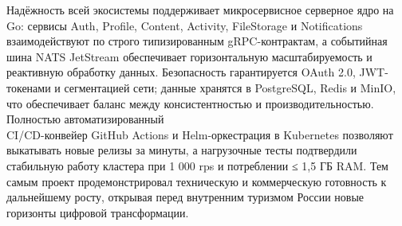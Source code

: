 Надёжность всей экосистемы поддерживает микросервисное серверное ядро на Go: сервисы Auth, Profile, Content, Activity, FileStorage и Notifications взаимодействуют по строго типизированным gRPC-контрактам, а событийная шина NATS JetStream обеспечивает горизонтальную масштабируемость и реактивную обработку данных. Безопасность гарантируется OAuth 2.0, JWT-токенами и сегментацией сети; данные хранятся в PostgreSQL, Redis и MinIO, что обеспечивает баланс между консистентностью и производительностью. Полностью автоматизированный \\ CI/CD-конвейер GitHub Actions и Helm-оркестрация в Kubernetes позволяют выкатывать новые релизы за минуты, а нагрузочные тесты подтвердили стабильную работу кластера при 1 000 rps и потреблении ≤ 1,5 ГБ RAM. Тем самым проект продемонстрировал техническую и коммерческую готовность к дальнейшему росту, открывая перед внутренним туризмом России новые горизонты цифровой трансформации.